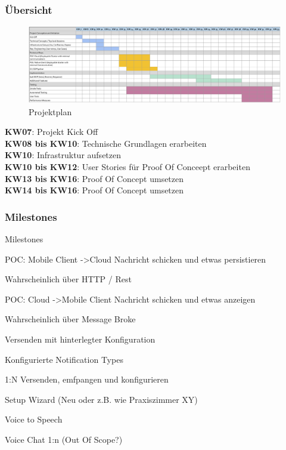 \subsubsection*{Übersicht}
\begin{figure}[h]
    \label{fig:projectPlan}
    \includegraphics[width=\linewidth]{graphics/Projectplanning}\caption[Projektplan]{Projektplan}
\end{figure}



\textbf{KW07}: Projekt Kick Off \\
\textbf{KW08 bis KW10}: Technische Grundlagen erarbeiten \\
\textbf{KW10}: Infrastruktur aufsetzen \\
\textbf{KW10 bis KW12}: User Stories für Proof Of Conceept erarbeiten \\
\textbf{KW13 bis KW16}: Proof Of Concept umsetzen \\
\textbf{KW14 bis KW16}: Proof Of Concept umsetzen \\

\subsubsection*{Milestones}

Milestones


POC: Mobile Client -\textgreater Cloud Nachricht schicken und etwas persistieren

Wahrscheinlich über HTTP / Rest


POC: Cloud -\textgreater Mobile Client Nachricht schicken und etwas anzeigen

Wahrscheinlich über Message Broke


Versenden mit hinterlegter Konfiguration


Konfigurierte Notification Types


1:N Versenden, emfpangen und konfigurieren


Setup Wizard (Neu oder z.B. wie Praxiszimmer XY)


Voice to Speech


Voice Chat 1:n (Out Of Scope?)




